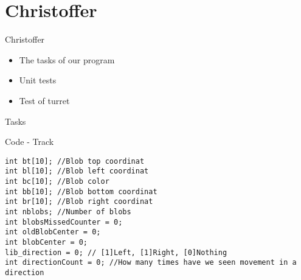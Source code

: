 \section{Christoffer}
\begin{frame}{Christoffer}
\begin{itemize}
\end{itemize}
\end{frame}

\begin{frame}{}
\begin{itemize}
  \item The tasks of our program
  \item Unit tests
  \item Test of turret
\end{itemize}
\end{frame}

\begin{frame}[fragile]{Tasks}
\end{frame}

\begin{frame}[fragile]{Code - Track}
\begin{center}
\begin{minipage}[H]{0.9\linewidth}
\begin{lstlisting}
int bt[10]; //Blob top coordinat
int bl[10]; //Blob left coordinat
int bc[10]; //Blob color
int bb[10]; //Blob bottom coordinat
int br[10]; //Blob right coordinat
int nblobs; //Number of blobs
int blobsMissedCounter = 0;
int oldBlobCenter = 0;
int blobCenter = 0;
lib_direction = 0; // [1]Left, [1]Right, [0]Nothing
int directionCount = 0; //How many times have we seen movement in a direction
\end{lstlisting} 
\end{minipage}
\end{center}
\end{frame}